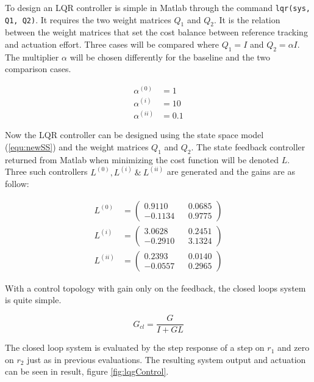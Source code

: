 \documentclass[a4paper, titlepage]{article}
\begin{document}
To design an LQR controller is simple in Matlab through the command \verb|lqr(sys, Q1, Q2)|.
It requires the two weight matrices $Q_1$ and $Q_2$.
It is the relation between the weight matrices that set the cost balance between  reference tracking and actuation effort.
Three cases will be compared where $Q_1 = I$ and $Q_2 = \alpha I$.
The multiplier $\alpha$ will be chosen differently for the baseline and the two comparison cases.

\begin{equation}
\begin{split}
\alpha^{(0)} &= 1 \\
\alpha^{(i)} &= 10 \\
\alpha^{(ii)} &= 0.1
\end{split}
\end{equation}

Now the LQR controller can be designed using the state space model (\ref{equ:newSS}) and the weight matrices $Q_1$ and $Q_2$.
The state feedback controller returned from Matlab when minimizing the cost function will be denoted $L$.
Three such controllers $L^{(0)}, L^{(i)} \:\&\: L^{(ii)}$ are generated and the gains are as follow:

\begin{equation}
\begin{split}
L^{(0)} &= 
\begin{pmatrix}
0.9110 	&& 0.0685  \\
-0.1134 	&& 0.9775
\end{pmatrix} \\
L^{(i)} &= 
\begin{pmatrix}
3.0628 && 0.2451 \\
-0.2910 && 3.1324
\end{pmatrix} \\
L^{(ii)} &= 
\begin{pmatrix}
0.2393 && 0.0140 \\
-0.0557 && 0.2965
\end{pmatrix}
\end{split}
\label{equ:lqrCont}
\end{equation}

With a control topology with gain only on the feedback, the closed loops system is quite simple.

\begin{equation}
G_{cl} = \frac{G}{I + GL}
\end{equation}

The closed loop system is evaluated by the step response of a step on $r_1$ and zero on $r_2$ just as in previous evaluations.
The resulting system output and actuation can be seen in result, figure \ref{fig:lqgControl}.
\end{document}

